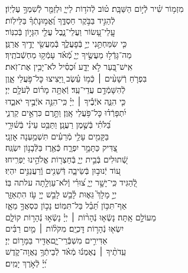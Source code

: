 \documentclass[twoside, openany, parskip=half, 11pt]{book}
\begin{document}
\begin{narrow}
מִזְמ֥וֹר שִׁ֗יר לְֿי֣וֹם הַשַּׁבָּֽת׃\hfill \break
ט֗וֹב לְֿהֹד֥וֹת לַייָ֑ \hfill וּלְזַמֵּ֖ר לְֿשִׁמְךָ֣ עֶלְיֽוֹן׃ \\
 לְֿהַגִּ֣יד בַּבֹּ֣קֶר חַסְדֶּ֑ךָ \hfill וֶ֝אֱמ֥וּנָתְֿךָ֗ בַּלֵּילֽוֹת׃ \\
 עֲֽלֵי־עָ֭שׂוֹר וַעֲלֵי־נָ֑בֶל \hfill עֲלֵ֖י הִגָּי֣וֹן בְּֿכִנּֽוֹר׃ \\
 כִּ֤י שִׂמַּחְתַּ֣נִי יְיָ֣ בְּֿפׇעֳלֶ֑ךָ \hfill בְּֽֿמַעֲשֵׂ֖י יָדֶ֣יךָ אֲרַנֵּֽן׃ \\
 מַה־גָּדְֿל֣וּ מַעֲשֶׂ֣יךָ יְיָ֑ \hfill מְֿ֝אֹ֗ד עָמְֿק֥וּ מַחְשְֿׁבֹתֶֽיךָ׃ \\
 אִֽישׁ־בַּ֭עַר לֹ֣א יֵדָ֑ע \hfill וּ֝כְסִ֗יל לֹא־יָבִ֥ין אֶת־זֹֽאת׃ \\
 בִּפְרֹ֤חַ רְֿשָׁעִ֨ים ׀ כְּֿמ֥וֹ עֵ֗שֶׂב \hfill וַ֭יָּצִיצוּ כׇּל־פֹּ֣עֲלֵי אָ֑וֶן\\ לְֿהִשָּׁמְֿדָ֥ם עֲדֵי־עַֽד׃ \hfill
 וְֿאַתָּ֥ה מָר֗וֹם לְֿעֹלָ֥ם יְיָ׃ \\
 כִּ֤י הִנֵּ֪ה אֹיְֿבֶ֡יךָ ׀ יְיָ֗ \hfill כִּֽי־הִנֵּ֣ה אֹיְֿבֶ֣יךָ יֹאבֵ֑דוּ\\ יִ֝תְפָּרְֿד֗וּ כׇּל־פֹּ֥עֲלֵי אָֽוֶן׃ \hfill
 וַתָּ֣רֶם כִּרְאֵ֣ים קַרְנִ֑י\\ בַּ֝לֹּתִ֗י בְּֿשֶׁ֣מֶן רַעֲנָֽן׃ \hfill
 וַתַּבֵּ֥ט עֵינִ֗י בְּֿשׁ֫וּרָ֥י\\ בַּקָּמִ֖ים עָלַ֥י מְֿרֵעִ֗ים \hfill תִּשְׁמַ֥עְנָה אׇזְנָֽי׃ \\
 צַ֭דִּיק כַּתָּמָ֣ר יִפְרָ֑ח \hfill כְּֿאֶ֖רֶז בַּלְּֿבָנ֣וֹן יִשְׂגֶּֽה׃ \\
 שְֿׁ֭תוּלִים בְּֿבֵ֣ית יְיָ֑ \hfill בְּֿחַצְר֖וֹת אֱלֹהֵ֣ינוּ יַפְרִֽיחוּ׃ \\
 ע֭וֹד יְֿנוּב֣וּן בְּֿשֵׂיבָ֑ה \hfill דְּֿשֵׁנִ֖ים וְֽֿרַעֲנַנִּ֣ים יִהְיֽוּ׃ \\
 לְֿ֭הַגִּיד כִּֽי־יָשָׁ֣ר יְיָ֑ \hfill צ֝וּרִ֗י וְֽֿלֹא־עַוְלָ֥תָה עלתה בּֽוֹ׃ \\



יְיָ֣ מָלָךְ֮ גֵּא֢וּת לָ֫בֵ֥שׁ\hfill
לָבֵ֣שׁ יְיָ֭ עֹ֣ז הִתְאַזָּ֑ר\\ אַף־תִּכּ֥וֹן תֵּ֝בֵ֗ל בַּל־תִּמּֽוֹט׃ \hfill
 נָכ֣וֹן כִּסְאֲךָ֣ מֵאָ֑ז\\ מֵעוֹלָ֣ם אָֽתָּה׃ \hfill
 נָשְֿׂא֤וּ נְֿהָר֨וֹת ׀ יְיָ֗ נָשְֿׂא֣וּ נְֿהָר֣וֹת קוֹלָ֑ם\\ יִשְׂא֖וּ נְֿהָר֣וֹת דׇּכְיָֽם׃ \hfill
 מִקֹּל֨וֹת ׀ מַ֤יִם רַבִּ֗ים\\ אַדִּירִ֣ים מִשְׁבְּֿֿרֵי־יָ֑ם\hfill אַדִּ֖יר בַּמָּר֣וֹם יְיָ׃ \\
 עֵֽדֹתֶ֨יךָ ׀ נֶאֶמְנ֬וּ מְֿאֹ֗ד \hfill לְֿבֵיתְֿךָ֥ נַאֲוָה־קֹ֑דֶשׁ\\ יְ֝יָ֗ לְֿאֹ֣רֶךְ יָמִֽים׃ \hfill \break

\end{narrow}
\end{document}
